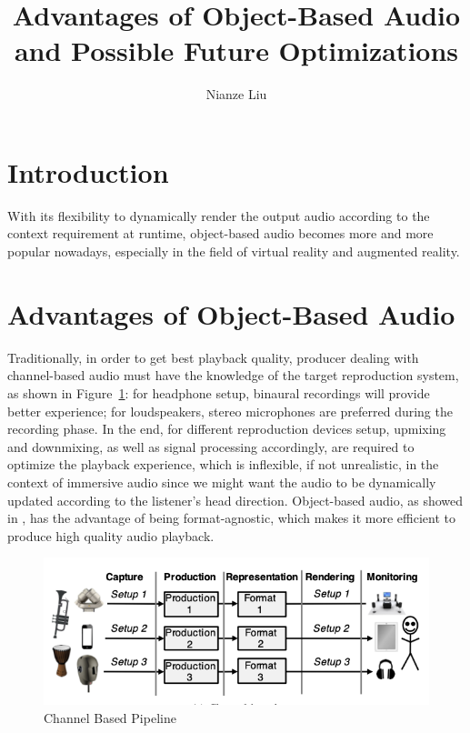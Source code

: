 \documentclass[jou]{apa6}
\title{Advantages of Object-Based Audio and Possible Future Optimizations}
\author{Nianze Liu}
\affiliation{New York University}
\begin{document}
\maketitle

\section{Introduction}

With its flexibility to dynamically render the output audio according to the context requirement at runtime, object-based audio becomes more and more popular nowadays, especially in the field of virtual reality and augmented reality. 

\section{Advantages of Object-Based Audio}

Traditionally, in order to get best playback quality, producer dealing with channel-based audio must have the knowledge of the target reproduction system, as shown in Figure~\ref{fig:Figure1}: for headphone setup, binaural recordings will provide better experience; for loudspeakers, stereo microphones are preferred during the recording phase. In the end, for different reproduction devices setup, upmixing and downmixing, as well as signal processing accordingly, are required to optimize the playback experience, which is inflexible, if not unrealistic, in the context of immersive audio since we might want the audio to be dynamically updated according to the listener's head direction. Object-based audio, as showed in \textcite{susal2016immersive}, has the advantage of being format-agnostic, which makes it more efficient to produce high quality audio playback.

\begin{figure}[h!]
    \includegraphics[width=\linewidth]{channel_based.png}
    \caption{Channel Based Pipeline}
    \label{fig:Figure1}
\end{figure}
\end{document}
